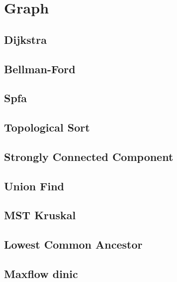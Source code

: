 \documentclass[10pt,landscape,a4paper,twocolumn]{article}
\begin{document}
\section{Graph}

\subsection{Dijkstra}


\subsection{Bellman-Ford}


\subsection{Spfa}


\subsection{Topological Sort}


\subsection{Strongly Connected Component}


\subsection{Union Find}


\subsection{MST Kruskal}


\subsection{Lowest Common Ancestor}



\subsection{Maxflow dinic}

\end{document}
